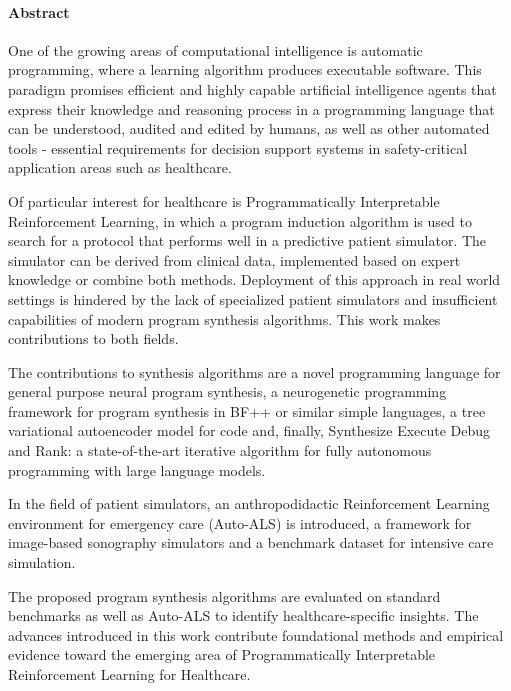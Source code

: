 \paragraph{Abstract}

One of the growing areas of computational intelligence is automatic programming, where a learning algorithm produces executable software. This paradigm promises efficient and highly capable artificial intelligence agents that express their knowledge and reasoning process in a programming language that can be understood, audited and edited by humans, as well as other automated tools - essential requirements for decision support systems in safety-critical application areas such as healthcare.

Of particular interest for healthcare is Programmatically Interpretable Reinforcement Learning, in which a program induction algorithm is used to search for a protocol that performs well in a predictive patient simulator.
The simulator can be derived from clinical data, implemented based on expert knowledge or combine both methods.
Deployment of this approach in real world settings is hindered by the lack of specialized patient simulators and insufficient capabilities of modern program synthesis algorithms.
This work makes contributions to both fields.

The contributions to synthesis algorithms are a novel programming language for general purpose neural program synthesis, a neurogenetic programming framework for program synthesis in BF++ or similar simple languages, a tree variational autoencoder model for code and, finally, Synthesize Execute Debug and Rank: a state-of-the-art iterative algorithm for fully autonomous programming with large language models.

In the field of patient simulators, an anthropodidactic Reinforcement Learning environment for emergency care (Auto-ALS) is introduced, a framework for image-based sonography simulators and a benchmark dataset for intensive care simulation. 

The proposed program synthesis algorithms are evaluated on standard benchmarks as well as Auto-ALS to identify healthcare-specific insights.
The advances introduced in this work contribute foundational methods and empirical evidence toward the emerging area of Programmatically Interpretable Reinforcement Learning for Healthcare.